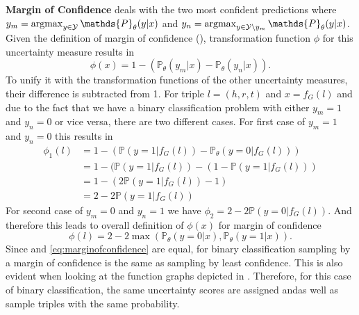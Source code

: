 \textbf{Margin of Confidence}
deals with the two most confident predictions where
$y_m = \argmax_{y \in \mathcal{Y}} \mathds{P}_{\theta}(y | x)$ 
and $y_n = \argmax_{y \in \mathcal{Y} \setminus y_m}{\mathds{P}_{\theta}(y | x)}$.
Given the definition of margin of confidence (), transformation function $\phi$ for this uncertainty measure results in
\begin{equation}
    \phi(x) = 1 - (\mathds{P}_{\theta}(y_m |x) - \mathds{P}_{\theta}(y_n | x)).
\end{equation}
To unify it with the transformation functions of the other uncertainty measures, their difference is subtracted from 1.
For triple $l = (h,r,t)$ and $x = f_G(l)$ and due to the fact that we have a binary classification problem with either $y_m = 1$ and $y_n = 0$ or vice versa, there are two different cases.
For first case of $y_m = 1$ and $y_n = 0$ this results in
\begin{equation}
\begin{split}
\phi_1(l) 
&= 1 - (\mathds{P}(y = 1 |f_G(l)) - \mathds{P}_{\theta}(y = 0 | f_G(l))) \\
&= 1 - (\mathds{P}(y = 1 |f_G(l)) -  (1 - \mathds{P}(y = 1 | f_G(l))) \\
&= 1 - (2 \mathds{P}(y = 1 |f_G(l)) - 1) \\
&= 2 - 2 \mathds{P}(y = 1 |f_G(l))
\end{split}
\end{equation}
For second case of $y_m = 0$ and $y_n = 1$ we have  $\phi_2 = 2 - 2 \mathds{P}(y = 0 |f_G(l))$. 
And therefore this leads to overall definition of $\phi(x)$ for margin of confidence
\begin{equation} \label{eq:marginofconfidence}
    \phi(l) = 2 - 2 \max(\mathds{P}_{\theta}(y = 0 |x), \mathds{P}_{\theta}(y = 1 |x)).
\end{equation}
Since  and \ref{eq:marginofconfidence} are equal, for binary classification sampling by a margin of confidence is the same as sampling by least confidence.
This is also evident when looking at the function graphs depicted in .
Therefore, for this case of binary classification, the same uncertainty scores are assigned and\usmax as well as \ussoftmax sample triples with the same probability.

